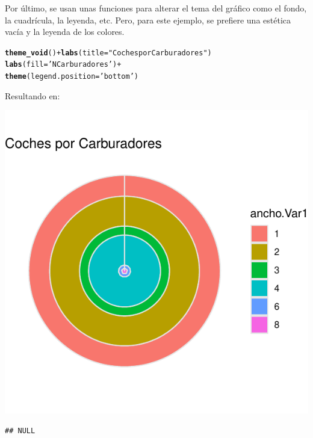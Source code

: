 \documentclass{article}\usepackage[]{graphicx}\usepackage[]{color}
\makeatletter
\def\maxwidth{ %
  \ifdim\Gin@nat@width>\linewidth
    \linewidth
  \else
    \Gin@nat@width
  \fi
}
\newcommand{\hlstr}[1]{\textcolor[rgb]{0.192,0.494,0.8}{#1}}%
\newcommand{\hlopt}[1]{\textcolor[rgb]{0,0,0}{#1}}%
\newcommand{\hlstd}[1]{\textcolor[rgb]{0.345,0.345,0.345}{#1}}%
\newcommand{\hlkwc}[1]{\textcolor[rgb]{0.333,0.667,0.333}{#1}}%
\newcommand{\hlkwd}[1]{\textcolor[rgb]{0.737,0.353,0.396}{\textbf{#1}}}%
\newenvironment{kframe}{%
 \def\at@end@of@kframe{}%
 \ifinner\ifhmode%
  \def\at@end@of@kframe{\end{minipage}}%
  \begin{minipage}{\columnwidth}%
 \fi\fi%
 \def\FrameCommand##1{\hskip\@totalleftmargin \hskip-\fboxsep
 \colorbox{shadecolor}{##1}\hskip-\fboxsep
     \hskip-\linewidth \hskip-\@totalleftmargin \hskip\columnwidth}%
 \MakeFramed {\advance\hsize-\width
   \@totalleftmargin\z@ \linewidth\hsize
   \@setminipage}}%
 {\par\unskip\endMakeFramed%
 \at@end@of@kframe}
\newenvironment{knitrout}{}{} %
\makeatother
\begin{document}
Por \'ultimo, se usan unas funciones para alterar el tema del gr\'afico como el fondo, la cuadr\'icula, la leyenda, etc. Pero, para este ejemplo, se prefiere una est\'etica vac\'ia y la leyenda de los colores.
\begin{knitrout}
\color{fgcolor}\begin{kframe}
\begin{alltt}
  \hlkwd{theme_void}\hlstd{()} \hlopt{+} \hlkwd{labs}\hlstd{(}\hlkwc{title} \hlstd{=} \hlstr{"Coches por Carburadores"}\hlstd{)}
  \hlkwd{labs}\hlstd{(}\hlkwc{fill}\hlstd{=}\hlstr{'N Carburadores'}\hlstd{)} \hlopt{+}
  \hlkwd{theme}\hlstd{(}\hlkwc{legend.position} \hlstd{=} \hlstr{'bottom'}\hlstd{)}
\end{alltt}
\end{kframe}
\end{knitrout}
Resultando en:
\begin{knitrout}
\color{fgcolor}

{\centering \includegraphics[width=\maxwidth]{figure/plot_ring_gg1-1} 

}


\begin{kframe}\begin{verbatim}
## NULL
\end{verbatim}
\end{kframe}
\end{knitrout}
\end{document}
